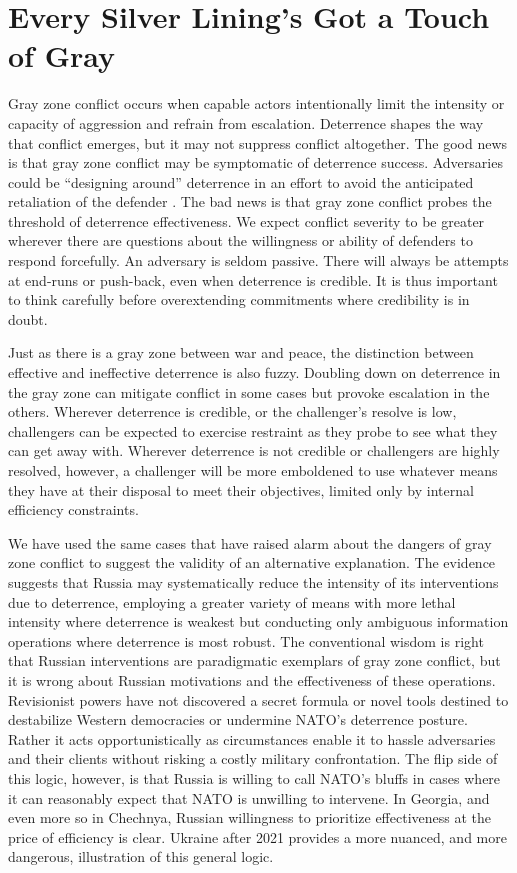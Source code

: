 \documentclass[11pt,letterpaper,pdftex,dvipsnames,table]{article}
\begin{document}
\section{Every Silver Lining's Got a Touch of Gray}
Gray zone conflict occurs when capable actors intentionally limit the intensity or capacity of aggression and refrain from escalation. Deterrence shapes the way that conflict emerges, but it may not suppress conflict altogether. The good news is that gray zone conflict may be symptomatic of deterrence success. Adversaries could be “designing around” deterrence in an effort to avoid the anticipated retaliation of the defender \citep{lieberman_reconceptualizingdeterrencenudging_2012}. The bad news is that gray zone conflict probes the threshold of deterrence effectiveness. We expect conflict severity to be greater wherever there are questions about the willingness or ability of defenders to respond forcefully. An adversary is seldom passive. There will always be attempts at end-runs or push-back, even when deterrence is credible. It is thus important to think carefully before overextending commitments where credibility is in doubt. 

Just as there is a gray zone between war and peace, the distinction between effective and ineffective deterrence is also fuzzy. Doubling down on deterrence in the gray zone can mitigate conflict in some cases but provoke escalation in the others. Wherever deterrence is credible, or the challenger's resolve is low, challengers can be expected to exercise restraint as they probe to see what they can get away with. Wherever deterrence is not credible or challengers are highly resolved, however, a challenger will be more emboldened to use whatever means they have at their disposal to meet their objectives, limited only by internal efficiency constraints.

We have used the same cases that have raised alarm about the dangers of gray zone conflict to suggest the validity of an alternative explanation. The evidence suggests that Russia may systematically reduce the intensity of its interventions due to deterrence, employing a greater variety of means with more lethal intensity where deterrence is weakest but conducting only ambiguous information operations where deterrence is most robust. The conventional wisdom is right that Russian interventions are paradigmatic exemplars of gray zone conflict, but it is wrong about Russian motivations and the effectiveness of these operations. Revisionist powers have not discovered a secret formula or novel tools destined to destabilize Western democracies or undermine NATO's deterrence posture. Rather it acts opportunistically as circumstances enable it to hassle adversaries and their clients without risking a costly military confrontation. The flip side of this logic, however, is that Russia is willing to call NATO’s bluffs in cases where it can reasonably expect that NATO is unwilling to intervene. In Georgia, and even more so in Chechnya, Russian willingness to prioritize effectiveness at the price of efficiency is clear. Ukraine after 2021 provides a more nuanced, and more dangerous, illustration of this general logic.
\end{document}
